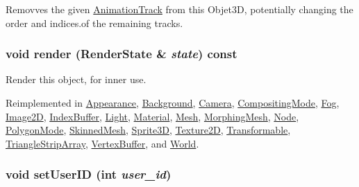 Removves the given \hyperlink{classm3g_1_1AnimationTrack}{AnimationTrack} from this Objet3D, potentially changing the order and indices.of the remaining tracks. \hypertarget{classm3g_1_1Object3D_8babc8a79b78615da51161e94029eea9}{
\subsubsection[{render}]{\setlength{\rightskip}{0pt plus 5cm}void render ({\bf RenderState} \& {\em state}) const}}
\label{classm3g_1_1Object3D_8babc8a79b78615da51161e94029eea9}


Render this object, for inner use. 

Reimplemented in \hyperlink{classm3g_1_1Appearance_8babc8a79b78615da51161e94029eea9}{Appearance}, \hyperlink{classm3g_1_1Background_8babc8a79b78615da51161e94029eea9}{Background}, \hyperlink{classm3g_1_1Camera_8babc8a79b78615da51161e94029eea9}{Camera}, \hyperlink{classm3g_1_1CompositingMode_8babc8a79b78615da51161e94029eea9}{CompositingMode}, \hyperlink{classm3g_1_1Fog_8babc8a79b78615da51161e94029eea9}{Fog}, \hyperlink{classm3g_1_1Image2D_8babc8a79b78615da51161e94029eea9}{Image2D}, \hyperlink{classm3g_1_1IndexBuffer_8babc8a79b78615da51161e94029eea9}{IndexBuffer}, \hyperlink{classm3g_1_1Light_8babc8a79b78615da51161e94029eea9}{Light}, \hyperlink{classm3g_1_1Material_8babc8a79b78615da51161e94029eea9}{Material}, \hyperlink{classm3g_1_1Mesh_8babc8a79b78615da51161e94029eea9}{Mesh}, \hyperlink{classm3g_1_1MorphingMesh_8babc8a79b78615da51161e94029eea9}{MorphingMesh}, \hyperlink{classm3g_1_1Node_8babc8a79b78615da51161e94029eea9}{Node}, \hyperlink{classm3g_1_1PolygonMode_8babc8a79b78615da51161e94029eea9}{PolygonMode}, \hyperlink{classm3g_1_1SkinnedMesh_8babc8a79b78615da51161e94029eea9}{SkinnedMesh}, \hyperlink{classm3g_1_1Sprite3D_8babc8a79b78615da51161e94029eea9}{Sprite3D}, \hyperlink{classm3g_1_1Texture2D_8babc8a79b78615da51161e94029eea9}{Texture2D}, \hyperlink{classm3g_1_1Transformable_8babc8a79b78615da51161e94029eea9}{Transformable}, \hyperlink{classm3g_1_1TriangleStripArray_8babc8a79b78615da51161e94029eea9}{TriangleStripArray}, \hyperlink{classm3g_1_1VertexBuffer_8babc8a79b78615da51161e94029eea9}{VertexBuffer}, and \hyperlink{classm3g_1_1World_8babc8a79b78615da51161e94029eea9}{World}.\hypertarget{classm3g_1_1Object3D_8eaa86665b4ca2c39691b6efc50108ee}{
\subsubsection[{setUserID}]{\setlength{\rightskip}{0pt plus 5cm}void setUserID (int {\em user\_\-id})}}
\label{classm3g_1_1Object3D_8eaa86665b4ca2c39691b6efc50108ee}


